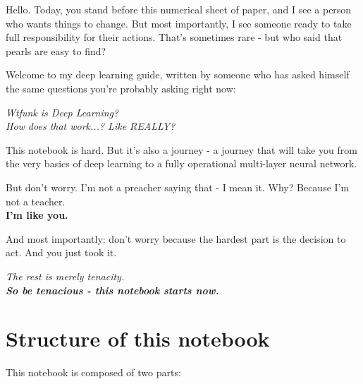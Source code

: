 \documentclass[11pt]{article}
\begin{document}
\noindent
Hello. Today, you stand before this numerical sheet of paper, and I see a person who wants things to change. But most importantly, I see someone ready to take full responsibility for their actions. That's sometimes rare - but who said that pearls are easy to find?

\vspace{1em}

\noindent
Welcome to my deep learning guide, written by someone who has asked himself the same questions you're probably asking right now:

\begin{center}
\Large\itshape
Wtfunk is Deep Learning?\\ How does that work...? Like REALLY?
\end{center}

\vspace{1em}

\noindent
This notebook is hard. But it's also a journey - a journey that will take you from the very basics of deep learning to a fully operational multi-layer neural network.

\vspace{1em}

\noindent
But don't worry. I'm not a preacher saying that - I mean it. Why? Because I'm not a teacher.\\
\textbf{I'm like you.}

\vspace{0.5em}

\noindent
And most importantly: don't worry because the hardest part is the decision to act. And you just took it.

\vspace{1em}

\begin{center}
\Large\itshape
The rest is merely tenacity.\\
\textbf{So be tenacious - this notebook starts now.}
\end{center}

\vspace{2em}

\section*{Structure of this notebook}

This notebook is composed of two parts:

\vspace{0.5em}
\end{document}

